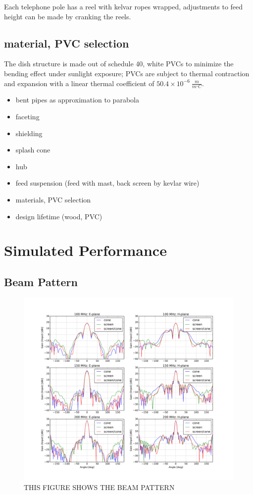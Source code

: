 \documentclass[preprint]{aastex}  %
\begin{document}
Each telephone pole has a reel with kelvar ropes wrapped, adjustments to feed height can be made by cranking the reels.


\subsection{material, PVC selection}
The dish structure is made out of schedule 40, white PVCs to minimize the bending effect under sunlight exposure; PVCs are subject to thermal contraction and expansion with a linear thermal coefficient of $50.4\times10^{-6}\ \frac{m}{m^{\circ}C}$.


\begin{itemize}
\item bent pipes as approximation to parabola 
\item faceting
\item shielding
\item splash cone
\item hub 
\item feed suspension (feed with mast, back screen by kevlar wire)
\item materials, PVC selection 
\item design lifetime (wood, PVC)
\end{itemize}

\section{Simulated Performance}
\label{sec:sim}

\subsection{Beam Pattern}

\begin{figure}[H]
	\begin{center}
	\includegraphics[width =\textwidth]{./dish_plots/Beampatterns_cone}
	\caption{THIS FIGURE SHOWS THE BEAM PATTERN 
\label{Fig:} }
	\end{center}
\end{figure}
\end{document}
